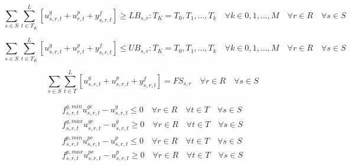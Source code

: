 \documentclass[12pt]{article}
\begin{document}
\begin{equation}
	\sum_{s \in S}\sum_{t\in T_K}^{L}[u_{s,r,t}^{g}+u_{r,t}^{p}+y_{s,r,t}^{f}]\geq LB_{s,r} : T_K=T_0,T_1,...,T_k \quad\forall k \in 0,1,...,M \quad\forall r \in R \quad\forall s \in S \label{eq:lb_s}
\end{equation}

\begin{equation}
	\sum_{s \in S}\sum_{t\in T_K}^{L}[u_{s,r,t}^{g}+u_{r,t}^{p}+y_{s,r,t}^{f}]\leq UB_{s,r} : T_K=T_0,T_1,...,T_k \quad\forall k \in 0,1,...,M \quad\forall r \in R \quad\forall s \in S \label{eq:ub_s}
\end{equation}

\begin{equation}
	\sum_{s \in S}\sum_{t\in T}^{L}[u_{s,r,t}^{g}+u_{s,r,t}^{p}+y_{s,r,t}^{f}]=FS_{s,r} \quad\forall r \in R \quad\forall s \in S \label{eq:fs_s}
\end{equation}

\begin{gather}
	f_{s,r,t}^{g,min}u_{s,r,t}^{gc}-u_{s,r,t}^{g}\leq 0 \quad\forall r \in R \quad\forall t \in T \quad\forall s \in S\\
	f_{s,r,t}^{g,max}u_{s,r,t}^{gc}-u_{s,r,t}^{g}\geq 0 \quad\forall r \in R \quad\forall t \in T \quad\forall s \in S\\
	f_{s,r,t}^{p,min}u_{s,r,t}^{pc}-u_{s,r,t}^{p}\leq 0 \quad\forall r \in R \quad\forall t \in T \quad\forall s \in S\\
	f_{s,r,t}^{p,max}u_{s,r,t}^{pc}-u_{s,r,t}^{p}\geq 0 \quad\forall r \in R \quad\forall t \in T \quad\forall s \in S
\end{gather}
\end{document}
